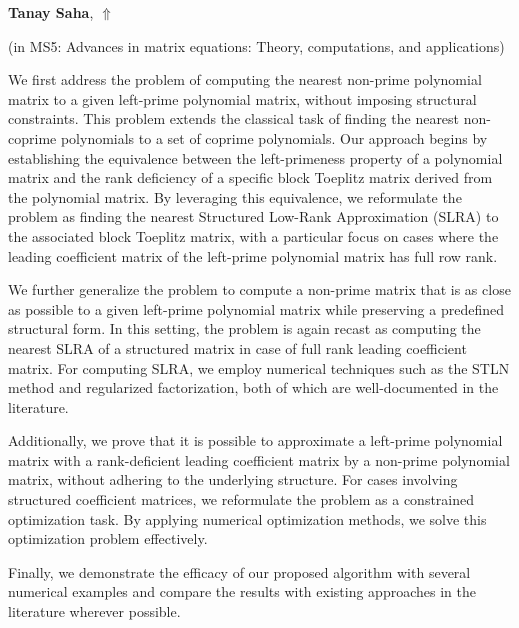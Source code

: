 \documentclass[ILAS2025-program.tex]{subfiles}
\begin{document}
\hypertarget{down0366}{}\begin{ilasabstract}
    
\textbf{Tanay Saha},  \hfill \hyperlink{up0366}{$\Uparrow$}
    
    
(in {\color{mstitle}MS5: Advances in matrix equations: Theory, computations, and applications})
        
\mtskip
    We first address the problem of computing the nearest non-prime polynomial matrix to a given left-prime polynomial matrix, without imposing structural constraints. This problem extends the classical task of finding the nearest non-coprime polynomials to a set of coprime polynomials. Our approach begins by establishing the equivalence between the left-primeness property of a polynomial matrix and the rank deficiency of a specific block Toeplitz matrix derived from the polynomial matrix. By leveraging this equivalence, we reformulate the problem as finding the nearest Structured Low-Rank Approximation (SLRA) to the associated block Toeplitz matrix, with a particular focus on cases where the leading coefficient matrix of the left-prime polynomial matrix has full row rank.

We further generalize the problem to compute a non-prime matrix that is as close as possible to a given left-prime polynomial matrix while preserving a predefined structural form. In this setting, the problem is again recast as computing the nearest SLRA of a structured matrix in case of full rank leading coefficient matrix. For computing SLRA, we employ numerical techniques such as the STLN method and regularized factorization, both of which are well-documented in the literature.

Additionally, we prove that it is possible to approximate a left-prime polynomial matrix with a rank-deficient leading coefficient matrix by a non-prime polynomial matrix, without adhering to the underlying structure. For cases involving structured coefficient matrices, we reformulate the problem as a constrained optimization task. By applying numerical optimization methods, we solve this optimization problem effectively.

Finally, we demonstrate the efficacy of our proposed algorithm with several numerical examples and compare the results with existing approaches in the literature wherever possible.
\end{ilasabstract}
    
\end{document}
